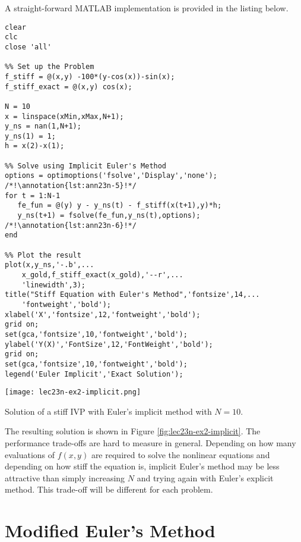 A straight-forward MATLAB implementation is provided in the listing below.
\begin{lstlisting}[style=myMatlab,name=lec23n-ex2]
clear
clc
close 'all'

%% Set up the Problem
f_stiff = @(x,y) -100*(y-cos(x))-sin(x);
f_stiff_exact = @(x,y) cos(x);

N = 10
x = linspace(xMin,xMax,N+1);
y_ns = nan(1,N+1);
y_ns(1) = 1;
h = x(2)-x(1);

%% Solve using Implicit Euler's Method
options = optimoptions('fsolve','Display','none'); /*!\annotation{lst:ann23n-5}!*/
for t = 1:N-1
   fe_fun = @(y) y - y_ns(t) - f_stiff(x(t+1),y)*h;
   y_ns(t+1) = fsolve(fe_fun,y_ns(t),options); /*!\annotation{lst:ann23n-6}!*/
end

%% Plot the result
plot(x,y_ns,'-.b',...
    x_gold,f_stiff_exact(x_gold),'--r',...
    'linewidth',3);
title("Stiff Equation with Euler's Method",'fontsize',14,...
    'fontweight','bold');
xlabel('X','fontsize',12,'fontweight','bold');
grid on;
set(gca,'fontsize',10,'fontweight','bold');
ylabel('Y(X)','FontSize',12,'FontWeight','bold');
grid on;
set(gca,'fontsize',10,'fontweight','bold');
legend('Euler Implicit','Exact Solution');
\end{lstlisting}
\begin{marginfigure}
\texttt{[image: lec23n-ex2-implicit.png]}
\caption{Solution of a stiff IVP with Euler's implicit method with $N=10$.}
\label{fig:lec23n-ex2-implicit}
\end{marginfigure}
The resulting solution is shown in Figure \ref{fig:lec23n-ex2-implicit}.  The performance trade-offs are hard to measure in general. Depending on how many evaluations of $f(x,y)$ are required to solve the nonlinear equations and depending on how stiff the equation is, implicit Euler's method may be less attractive than simply increasing $N$ and trying again with Euler's explicit method.  This trade-off will be different for each problem.

\section{Modified Euler's Method}

